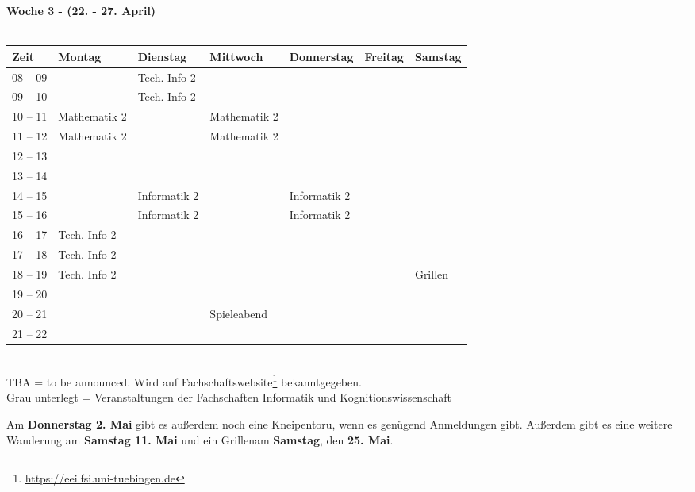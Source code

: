 \textbf{Woche 3 - (22. - 27. April)}\\
\\
\begin{tabular}{|l|p{}|p{}|p{}|p{}|p{}|p{}|} \hline
 Zeit & Montag & Dienstag & Mittwoch & Donnerstag & Freitag & Samstag \\ \hline \hline
 08 -- 09 & &\footnotesize{Tech. Info 2} & & & &\\ \cline{1-1}
 09 -- 10 & &\footnotesize{Tech. Info 2} & & & &  \\ \cline{1-1} \cline{3-3} \cline{2-2} \cline{4-4}
 10 -- 11 &\footnotesize{Mathematik 2} & &\footnotesize{Mathematik 2} & & & \\ \cline{1-1}
 11 -- 12 &\footnotesize{Mathematik 2} & &\footnotesize{Mathematik 2} & & &\\ \cline{1-1} \cline{2-2} \cline{4-4}
 12 -- 13 & & & & & & \\ \cline{1-1} 
 13 -- 14 & & & & & &  \\ \cline{1-1} \cline{3-3} \cline{5-5}
 14 -- 15 & &\footnotesize{Informatik 2} & &\footnotesize{Informatik 2} & &  \\ \cline{1-1}
 15 -- 16 & &\footnotesize{Informatik 2} & &\footnotesize{Informatik 2} & & \\ \cline {1-1} \cline{3-3} \cline{5-5} \cline{2-2}
 16 -- 17 & \footnotesize{Tech. Info 2}& & & & & \\ \cline{1-1}
 17 -- 18 &\footnotesize{Tech. Info 2} & & & & & \\ \cline{1-1}
 18 -- 19 &\footnotesize{Tech. Info 2} & & & & &\cellcolor{lightlightgray} \footnotesize{Grillen}  \\ \cline{1-2}
 19 -- 20 & & & & & &\cellcolor{lightlightgray} \\ \cline{1-1}
 20 -- 21 & & &\cellcolor{lightlightgray} \footnotesize{Spieleabend} & & &\cellcolor{lightlightgray} \\ \cline{1-1}
 21 -- 22 & & &\cellcolor{lightlightgray} & & &\cellcolor{lightlightgray} \\ \hline
\end{tabular}
\\
{\scriptsize TBA = to be announced. Wird auf Fachschaftswebsite\footnote{\url{https://eei.fsi.uni-tuebingen.de}}  bekanntgegeben.} \\
{\scriptsize Grau unterlegt = Veranstaltungen der Fachschaften Informatik und Kognitionswissenschaft }

\normalsize
Am \textbf{Donnerstag 2. Mai} gibt es außerdem noch eine Kneipentoru, wenn es genügend Anmeldungen gibt. Außerdem gibt es eine weitere Wanderung am \textbf{Samstag 11. Mai} und ein Grillenam \textbf{Samstag}, den \textbf{25. Mai}.

\newpage
\normalsize

